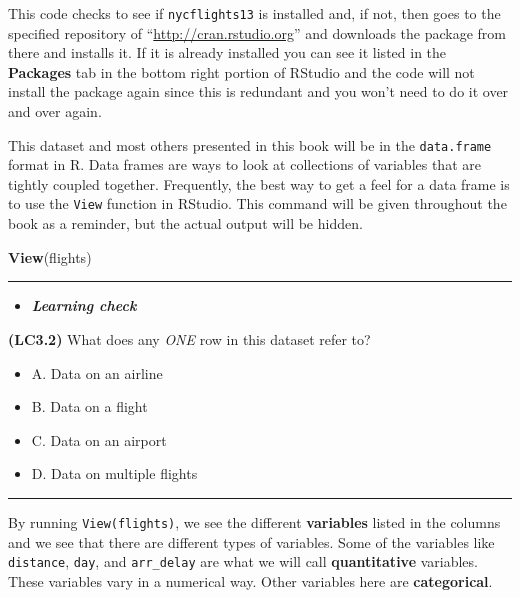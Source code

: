\documentclass[]{tufte-book}
\newenvironment{Shaded}{\begin{snugshade}}{\end{snugshade}}
\newcommand{\KeywordTok}[1]{\textcolor[rgb]{0.13,0.29,0.53}{\textbf{{#1}}}}
\newcommand{\NormalTok}[1]{{#1}}
\providecommand{\tightlist}{%
  \setlength{\itemsep}{0pt}\setlength{\parskip}{0pt}}
\newenvironment{rmdblock}[1]
  {\begin{shaded*}
  \begin{itemize}
  \renewcommand{\labelitemi}{
    \raisebox{-.7\height}[0pt][0pt]{
    }
  }
  \item
  }
  {
  \end{itemize}
  \end{shaded*}
  }
\newenvironment{learncheck}
  {\begin{rmdblock}{warning}}
  {\end{rmdblock}}
\begin{document}
This code checks to see if \texttt{nycflights13} is installed and, if
not, then goes to the specified repository of
``\url{http://cran.rstudio.org}'' and downloads the package from there
and installs it. If it is already installed you can see it listed in the
\textbf{Packages} tab in the bottom right portion of RStudio and the
code will not install the package again since this is redundant and you
won't need to do it over and over again.

This dataset and most others presented in this book will be in the
\texttt{data.frame} format in R. Data frames are ways to look at
collections of variables that are tightly coupled together. Frequently,
the best way to get a feel for a data frame is to use the \texttt{View}
function in RStudio. This command will be given throughout the book as a
reminder, but the actual output will be hidden.

\begin{Shaded}
\begin{Highlighting}[]
\KeywordTok{View}\NormalTok{(flights)}
\end{Highlighting}
\end{Shaded}

\begin{center}\rule{\linewidth}{\linethickness}\end{center}

\begin{learncheck}
\textbf{\emph{Learning check}}
\end{learncheck}

\textbf{(LC3.2)} What does any \emph{ONE} row in this dataset refer to?

\begin{itemize}
\tightlist
\item
  A. Data on an airline
\item
  B. Data on a flight
\item
  C. Data on an airport
\item
  D. Data on multiple flights
\end{itemize}

\begin{center}\rule{\linewidth}{\linethickness}\end{center}

By running \texttt{View(flights)}, we see the different
\textbf{variables} listed in the columns and we see that there are
different types of variables. Some of the variables like
\texttt{distance}, \texttt{day}, and \texttt{arr\_delay} are what we
will call \textbf{quantitative} variables. These variables vary in a
numerical way. Other variables here are \textbf{categorical}.
\end{document}
